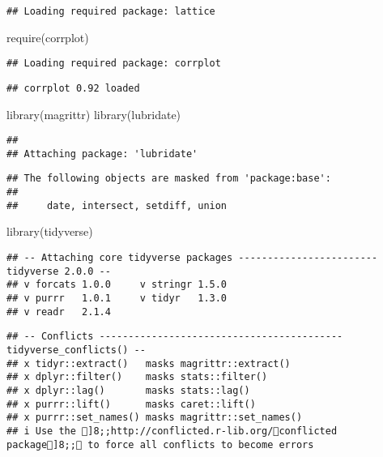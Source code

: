 \documentclass[
]{article}
\newenvironment{Shaded}{\begin{snugshade}}{\end{snugshade}}
\newcommand{\FunctionTok}[1]{\textcolor[rgb]{0.00,0.00,0.00}{#1}}
\newcommand{\NormalTok}[1]{#1}
\begin{document}
\begin{verbatim}
## Loading required package: lattice
\end{verbatim}

\begin{Shaded}
\begin{Highlighting}[]
\FunctionTok{require}\NormalTok{(corrplot)}
\end{Highlighting}
\end{Shaded}

\begin{verbatim}
## Loading required package: corrplot
\end{verbatim}

\begin{verbatim}
## corrplot 0.92 loaded
\end{verbatim}

\begin{Shaded}
\begin{Highlighting}[]
\FunctionTok{library}\NormalTok{(magrittr)}
\FunctionTok{library}\NormalTok{(lubridate)}
\end{Highlighting}
\end{Shaded}

\begin{verbatim}
## 
## Attaching package: 'lubridate'
\end{verbatim}

\begin{verbatim}
## The following objects are masked from 'package:base':
## 
##     date, intersect, setdiff, union
\end{verbatim}

\begin{Shaded}
\begin{Highlighting}[]
\FunctionTok{library}\NormalTok{(tidyverse)}
\end{Highlighting}
\end{Shaded}

\begin{verbatim}
## -- Attaching core tidyverse packages ------------------------ tidyverse 2.0.0 --
## v forcats 1.0.0     v stringr 1.5.0
## v purrr   1.0.1     v tidyr   1.3.0
## v readr   2.1.4
\end{verbatim}

\begin{verbatim}
## -- Conflicts ------------------------------------------ tidyverse_conflicts() --
## x tidyr::extract()   masks magrittr::extract()
## x dplyr::filter()    masks stats::filter()
## x dplyr::lag()       masks stats::lag()
## x purrr::lift()      masks caret::lift()
## x purrr::set_names() masks magrittr::set_names()
## i Use the ]8;;http://conflicted.r-lib.org/conflicted package]8;; to force all conflicts to become errors
\end{verbatim}
\end{document}
